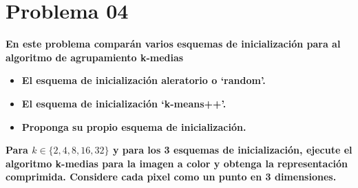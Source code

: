 \section*{Problema 04}

\textbf{En este problema comparán varios esquemas de inicialización para al algoritmo de agrupamiento k-medias}

\begin{itemize}
    \item \textbf{El esquema de inicialización aleratorio o `random'.}
    \item \textbf{El esquema de inicialización `k-means++'.}
    \item \textbf{Proponga su propio esquema de inicialización.}
\end{itemize}

\textbf{Para $k \in \{2, 4, 8, 16, 32\}$ y para los 3 esquemas de inicialización, ejecute el algoritmo k-medias para la imagen a color  y obtenga la representación comprimida. Considere cada pixel como un punto en 3 dimensiones.}


